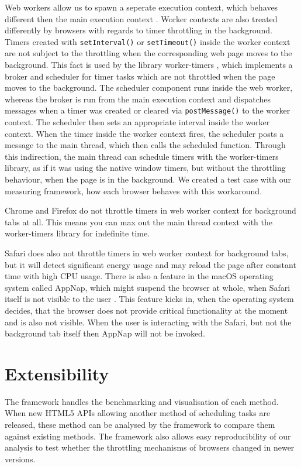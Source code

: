 \documentclass[
	ruledheaders=section,%
	class=report,%
	thesis={type=bachelor},%
	accentcolor=9c,%
	custommargins=true,%
	marginpar=false,%
	parskip=half-,%
	fontsize=11pt,%
]{tudapub}
\begin{document}
  Web workers allow us to spawn a seperate execution context, which behaves different then the main execution context \cite{mdn-worker}. Worker contexts are also treated differently by browsers with regards to timer throttling in the background. Timers created with \texttt{setInterval()} or \texttt{setTimeout()} inside the worker context are not subject to the throttling when the corresponding web page moves to the background. This fact is used by the library worker-timers \cite{worker-timers}, which implements a broker and scheduler for timer tasks which are not throttled when the page moves to the background. The scheduler component runs inside the web worker, whereas the broker is run from the main execution context and dispatches messages when a timer was created or cleared via \texttt{postMessage()} to the worker context. The scheduler then sets an appropriate interval inside the worker context. When the timer inside the worker context fires, the scheduler posts a message to the main thread, which then calls the scheduled function. Through this indirection, the main thread can schedule timers with the worker-timers library, as if it was using the native window timers, but without the throttling behaviour, when the page is in the background. We created a test case with our measuring framework, how each browser behaves with this workaround.
  
  Chrome and Firefox do not throttle timers in web worker context for background tabs at all. This means you can max out the main thread context with the worker-timers library for indefinite time.

  Safari does also not throttle timers in web worker context for background tabs, but it will detect significant energy usage and may reload the page after constant time with high CPU usage. There is also a feature in the macOS operating system called AppNap, which might suspend the browser at whole, when Safari itself is not visible to the user \cite{osx-app-nap}. This feature kicks in, when the operating system decides, that the browser does not provide critical functionality at the moment and is also not visible. When the user is interacting with the Safari, but not the background tab itself then AppNap will not be invoked.
  

  \section{Extensibility}


  The framework handles the benchmarking and visualisation of each method. When new HTML5 APIs allowing another method of scheduling tasks are released, these method can be analysed by the framework to compare them against existing methods. The framework also allows easy reproducibility of our analysis to test whether the throttling mechanisms of browsers changed in newer versions.
\end{document}
